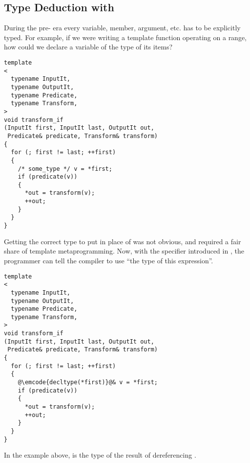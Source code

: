 \subsection{Type Deduction with }
\label{decltype}

During the pre- era every variable, member, argument, etc. has
to be explicitly typed. For example, if we were writing a template
function operating on a range, how could we declare a variable of the
type of its items?

\begin{lstlisting}
template
<
  typename InputIt,
  typename OutputIt,
  typename Predicate,
  typename Transform,
>
void transform_if
(InputIt first, InputIt last, OutputIt out,
 Predicate& predicate, Transform& transform)
{
  for (; first != last; ++first)
  {
    /* some_type */ v = *first;
    if (predicate(v))
    {
      *out = transform(v);
      ++out;
    }
  }
}
\end{lstlisting}

Getting the correct type to put in place of  was not
obvious, and required a fair share of template metaprogramming. Now,
with the  specifier introduced in , the
programmer can tell the compiler to use ``the type of this
expression''.


\begin{lstlisting}
template
<
  typename InputIt,
  typename OutputIt,
  typename Predicate,
  typename Transform,
>
void transform_if
(InputIt first, InputIt last, OutputIt out,
 Predicate& predicate, Transform& transform)
{
  for (; first != last; ++first)
  {
    @\emcode{decltype(*first)}@& v = *first;
    if (predicate(v))
    {
      *out = transform(v);
      ++out;
    }
  }
}
\end{lstlisting}

In the example above,  is the type of the
result of dereferencing .
